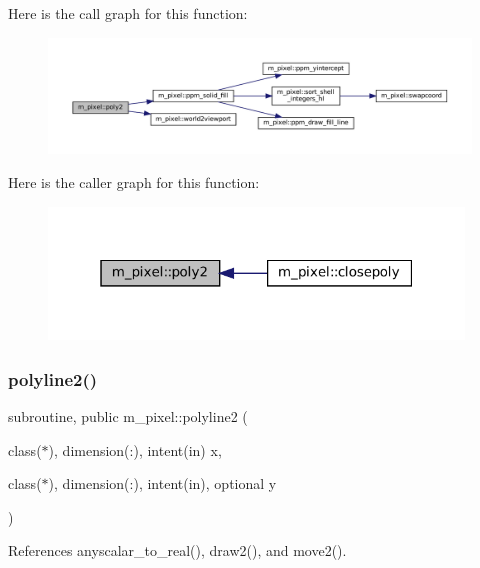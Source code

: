 Here is the call graph for this function\+:
\nopagebreak
\begin{figure}[H]
\begin{center}
\leavevmode
\includegraphics[width=350pt]{namespacem__pixel_a996117d631dce0e92056a0c486be5109_cgraph}
\end{center}
\end{figure}
Here is the caller graph for this function\+:
\nopagebreak
\begin{figure}[H]
\begin{center}
\leavevmode
\includegraphics[width=313pt]{namespacem__pixel_a996117d631dce0e92056a0c486be5109_icgraph}
\end{center}
\end{figure}
\mbox{\label{namespacem__pixel_a0678be124889fb633475a6724ddb6640}} 
\subsubsection{\texorpdfstring{polyline2()}{polyline2()}}
{\footnotesize\ttfamily subroutine, public m\+\_\+pixel\+::polyline2 (\begin{DoxyParamCaption}\item[{class($\ast$), dimension(\+:), intent(in)}]{x,  }\item[{class($\ast$), dimension(\+:), intent(in), optional}]{y }\end{DoxyParamCaption})}



References anyscalar\+\_\+to\+\_\+real(), draw2(), and move2().

